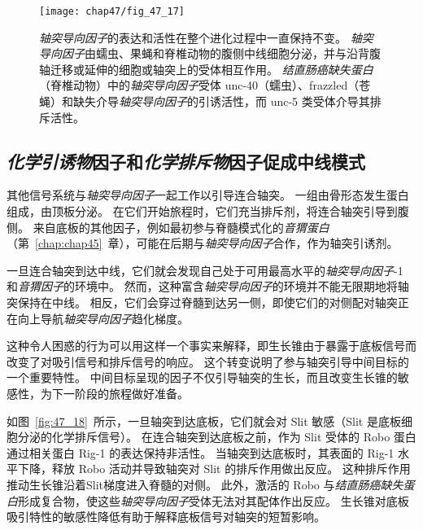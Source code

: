 \begin{figure}[htbp]
	\centering
	\texttt{[image: chap47/fig\_47\_17]}
	\caption{\textit{轴突导向因子}的表达和活性在整个进化过程中一直保持不变。
		\textit{轴突导向因子}由蠕虫、果蝇和脊椎动物的腹侧中线细胞分泌，并与沿背腹轴迁移或延伸的细胞或轴突上的受体相互作用。
		\textit{结直肠癌缺失蛋白}（脊椎动物）中的\textit{轴突导向因子}受体 unc-40（蠕虫）、frazzled（苍蝇）和缺失介导\textit{轴突导向因子}的引诱活性，而 unc-5 类受体介导其排斥活性。}
	\label{fig:47_17}
\end{figure}



\subsection{\textit{化学引诱物}因子和\textit{化学排斥物}因子促成中线模式}

其他信号系统与\textit{轴突导向因子}一起工作以引导连合轴突。
一组由骨形态发生蛋白组成，由顶板分泌。
在它们开始旅程时，它们充当排斥剂，将连合轴突引导到腹侧。
来自底板的其他因子，例如最初参与脊髓模式化的\textit{音猬蛋白}（第~\ref{chap:chap45}~章），可能在后期与\textit{轴突导向因子}合作，作为轴突引诱剂。


一旦连合轴突到达中线，它们就会发现自己处于可用最高水平的\textit{轴突导向因子}-1 和\textit{音猬因子}的环境中。
然而，这种富含\textit{轴突导向因子}的环境并不能无限期地将轴突保持在中线。
相反，它们会穿过脊髓到达另一侧，即使它们的对侧配对轴突正在向上导航\textit{轴突导向因子}趋化梯度。


这种令人困惑的行为可以用这样一个事实来解释，即生长锥由于暴露于底板信号而改变了对吸引信号和排斥信号的响应。
这个转变说明了参与轴突引导中间目标的一个重要特性。
中间目标呈现的因子不仅引导轴突的生长，而且改变生长锥的敏感性，为下一阶段的旅程做好准备。


如图~\ref{fig:47_18}~所示，一旦轴突到达底板，它们就会对 Slit 敏感（Slit 是底板细胞分泌的化学排斥信号）。
在连合轴突到达底板之前，作为 Slit 受体的 Robo 蛋白通过相关蛋白 Rig-1 的表达保持非活性。
当轴突到达底板时，其表面的 Rig-1 水平下降，释放 Robo 活动并导致轴突对 Slit 的排斥作用做出反应。
这种排斥作用推动生长锥沿着Slit梯度进入脊髓的对侧。
此外，激活的 Robo 与\textit{结直肠癌缺失蛋白}形成复合物，使这些\textit{轴突导向因子}受体无法对其配体作出反应。
生长锥对底板吸引特性的敏感性降低有助于解释底板信号对轴突的短暂影响。


